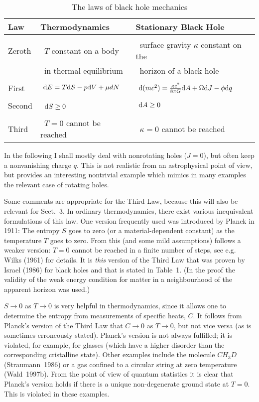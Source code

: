 \documentclass[12pt]{article}
\def\D{{\rm d}}
\begin{document}
\begin{table}[htb]
\caption[ ]{The laws of black hole mechanics}
\begin{flushleft}
\renewcommand{\arraystretch}{1.2}  
\begin{tabular}{l|l|l}
{Law} & {Thermodynamics} &  Stationary Black Hole\\ \hline
{} & {} & {} \\
Zeroth & \ $T$ constant on a body &\ surface gravity
                                    $\kappa$ constant on the \\
{} &\ in thermal equilibrium & \ horizon of a black hole\\
{} & {} & {} \\
First & $\ \D E=T\D S-p\D V+\mu dN$ &
 $\ \D(mc^2)=\frac{\kappa c^2}{8\pi G}\D A
+\Omega \D J-\phi \D q$ \\ 
{} & {} & {} \\
Second &\ $\D S\geq 0$ & $\ \D A\geq 0$ \\
{} & {} & {} \\
Third &\ $T=0$ cannot be reached &\ $\kappa=0$ cannot be reached\\
\end{tabular}
\renewcommand{\arraystretch}{1}
\end{flushleft}\end{table}

In the following I shall mostly deal with nonrotating holes
($J=0$), but often keep a nonvanishing charge $q$.
This is not realistic from an astrophysical point of view,
but provides an interesting nontrivial example which mimics
in many examples the relevant case of rotating holes. 

Some comments are appropriate for the Third Law, because this
will also be relevant for Sect.~3. In ordinary thermodynamics,
there exist various inequivalent formulations of this law.
One version frequently used was introduced by Planck in 1911: 
The entropy $S$ goes to zero (or a material-dependent constant) as
the temperature $T$ goes to zero. From this (and some mild
assumptions) follows a weaker version: $T=0$ cannot be reached
in a finite number of steps, see e.g. Wilks (1961) for details.
It is {\em this} version of the Third Law that was proven
by Israel (1986) for black holes and that is stated in 
Table~1. (In the proof the validity of the weak energy condition
for matter in a neighbourhood of the apparent horizon was used.)

\vskip 2mm

$S\to 0$ as $T\to 0$ is very helpful in thermodynamics,
since it allows one to determine the entropy from measurements
of specific heats, $C$. It follows from Planck's version of
the Third Law that $C\to 0$ as $T\to 0$, but not vice versa
(as is sometimes erroneously stated). Planck's version is
not always fulfilled; it is violated, for example, for glasses
(which have a higher disorder than the corresponding cristalline
state). Other examples include the molecule $CH_3D$ (Straumann~1986)
or a gas confined to a circular string at zero temperature
(Wald~1997b). From the point of view of quantum statistics
it is clear that Planck's version holds if there is a unique
non-degenerate ground state at $T=0$. This is violated in these
examples.
\end{document}
